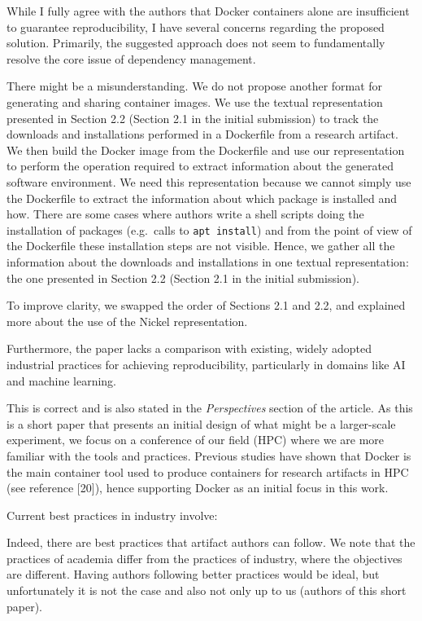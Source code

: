 \documentclass[%
	11pt,
	final,
]{article}
\makeatletter
\newcommand{\eg}{e.g.\@}
\makeatother
\begin{document}
While I fully agree with the authors that Docker containers alone are insufficient to guarantee reproducibility, I have several concerns regarding the proposed solution.
Primarily, the suggested approach does not seem to fundamentally resolve the core issue of dependency management.
\begin{review-answer}
  There might be a misunderstanding.
  We do not propose another format for generating and sharing container images.
  We use the textual representation presented in Section 2.2 (Section 2.1 in the initial submission) to track the downloads and installations performed in a Dockerfile from a research artifact.
  We then build the Docker image from the Dockerfile and use our representation to perform the operation required to extract information about the generated software environment.
  We need this representation because we cannot simply use the Dockerfile to extract the information about which package is installed and how.
  There are some cases where authors write a shell scripts doing the installation of packages (\eg\ calls to \texttt{apt install}) and from the point of view of the Dockerfile these installation steps are not visible.
  Hence, we gather all the information about the downloads and installations in one textual representation: the one presented in Section 2.2 (Section 2.1 in the initial submission).

  To improve clarity, we swapped the order of Sections 2.1 and 2.2, and explained more about the use of the Nickel representation.
\end{review-answer}
Furthermore, the paper lacks a comparison with existing, widely adopted industrial practices for achieving reproducibility, particularly in domains like AI and machine learning.
\begin{review-answer}
  This is correct and is also stated in the \emph{Perspectives} section of the article.
  As this is a short paper that presents an initial design of what might be a larger-scale experiment, we focus on a conference of our field (HPC) where we are more familiar with the tools and practices.
  Previous studies have shown that Docker is the main container tool used to produce containers for research artifacts in HPC (see reference [20]), hence supporting Docker as an initial focus in this work.
\end{review-answer}

Current best practices in industry involve:

\begin{review-answer}
  Indeed, there are best practices that artifact authors can follow.
  We note that the practices of academia differ from the practices of industry, where the objectives are different.
  Having authors following better practices would be ideal, but unfortunately it is not the case and also not only up to us (authors of this short paper).
\end{review-answer}
\end{document}
